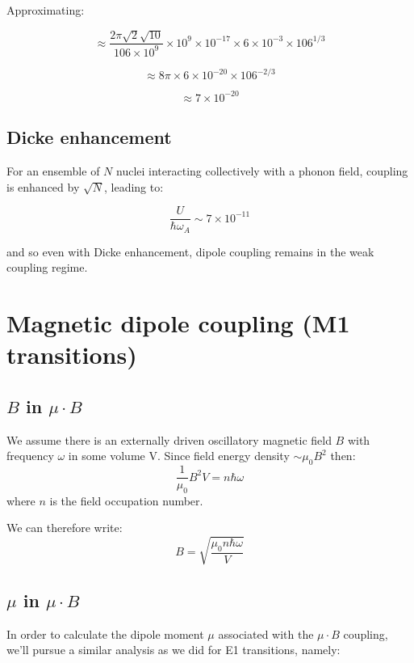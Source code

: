 \documentclass[
]{article}
\renewcommand{\[}{\begin{equation}}
\renewcommand{\]}{\end{equation}}
\begin{document}
Approximating:

\[
\approx \frac{ 2 \pi \sqrt{2} \sqrt{10}}{106 \times 10^9} \times 10^9 \times 10^{-17} \times 6 \times 10^{-3} \times 106^{1/3}
\]

\[
\approx 8\pi \times 6 \times 10^{-20} \times 106^{-2/3}
\]

\[
\approx 7 \times 10^{-20}
\]

\subsection{Dicke enhancement}\label{dicke-enhancement-1}

For an ensemble of \(N\) nuclei interacting collectively with a phonon
field, coupling is enhanced by \(\sqrt{N}\), leading to:

\[
\frac{U}{\hbar \omega_A} \sim 7 \times 10^{-11}
\]

and so even with Dicke enhancement, dipole coupling remains in the weak
coupling regime.

\section{Magnetic dipole coupling (M1
transitions)}\label{magnetic-dipole-coupling-m1-transitions}

\subsection{\texorpdfstring{\(B\) in
\(\mu\cdot B\)}{B in \textbackslash mu\textbackslash cdot B}}\label{b-in-mucdot-b}

We assume there is an externally driven oscillatory magnetic field \(B\)
with frequency \(\omega\) in some volume V. Since field energy density
\(\sim \mu_0B^2\) then: \[
\frac{1}{\mu_0} B^2 V = n\hbar\omega
\] where \(n\) is the field occupation number.

We can therefore write: \[
B = \sqrt{\frac{\mu_0n\hbar\omega}{V}}
\label{eq:B}
\]

\subsection{\texorpdfstring{\(\mu\) in
\(\mu \cdot B\)}{\textbackslash mu in \textbackslash mu \textbackslash cdot B}}\label{mu-in-mu-cdot-b}

In order to calculate the dipole moment \(\mu\) associated with the
\(\mu\cdot B\) coupling, we'll pursue a similar analysis as we did for
E1 transitions, namely:
\end{document}
